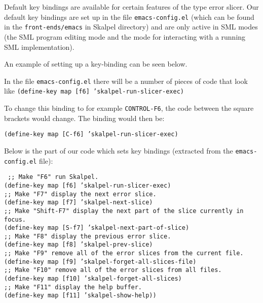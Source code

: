 \documentclass{report}
\begin{document}
Default key bindings are available for certain features of the type
error slicer. Our default key bindings are set up in the file
\texttt{emacs-config.el} (which can be found in the
\texttt{front-ends/emacs} in Skalpel directory) and are only active in
SML modes (the SML program editing mode and the mode for interacting
with a running SML implementation).


\medskip
An example of setting up a key-binding can be seen below.

In the file \texttt{emacs-config.el} there will be a number of
pieces of code that look like
\texttt{(define-key map [f6] 'skalpel-run-slicer-exec)}

To change this binding to for example \texttt{CONTROL-F6}, the code
between the square brackets would change. The binding would then be:

\texttt{(define-key map [C-f6] 'skalpel-run-slicer-exec)}

\medskip
Below is the part of our code which sets key bindings (extracted from
the \texttt{emacs-config.el} file):

\texttt{
  ;; Make "F6" run Skalpel.\\
  (define-key map [f6] 'skalpel-run-slicer-exec)\\
  ;; Make "F7" display the next error slice.\\
  (define-key map [f7] 'skalpel-next-slice)\\
  ;; Make "Shift-F7" display the next part of the slice currently in focus.\\
  (define-key map [S-f7] 'skalpel-next-part-of-slice)\\
  ;; Make "F8" display the previous error slice.\\
  (define-key map [f8] 'skalpel-prev-slice)\\
  ;; Make "F9" remove all of the error slices from the current file.\\
  (define-key map [f9] 'skalpel-forget-all-slices-file)\\
  ;; Make "F10" remove all of the error slices from all files.\\
  (define-key map [f10] 'skalpel-forget-all-slices)\\
  ;; Make "F11" display the help buffer.\\
  (define-key map [f11] 'skalpel-show-help))
}
\end{document}
